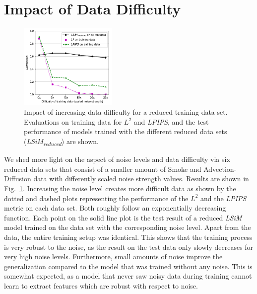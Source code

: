 
\section{Impact of Data Difficulty} \label{append: noise}
\begin{figure}[ht]
    \centering
    \includegraphics[width=0.42\textwidth]{Images/DataDifficulty}
    \vspace{-0.4cm}
    \caption{Impact of increasing data difficulty for a reduced training data set. 
    Evaluations on training data for $L^2$ and \textit{LPIPS}, and the test performance of models trained with the different reduced data sets (\textit{LSiM\textsubscript{reduced}}) are shown.}
    \label{fig: data difficulty}
\end{figure}
We shed more light on the aspect of noise levels and data difficulty via six reduced data sets that consist of a smaller amount of Smoke and Advection-Diffusion data with differently scaled noise strength values. Results are shown in Fig.~\ref{fig: data difficulty}.
Increasing the noise level creates more difficult data as shown by the dotted and dashed plots representing the performance of the \textit{$L^2$} and the \textit{LPIPS} metric on each data set. Both roughly follow an exponentially decreasing function. Each point on the solid line plot is the test result of a reduced \textit{LSiM} model trained on the data set with the corresponding noise level. Apart from the data, the entire training setup was identical. This shows that the training process is very robust to the noise, as the result on the test data only slowly decreases for very high noise levels. Furthermore, small amounts of noise improve the generalization compared to the model that was trained without any noise. This is somewhat expected, as a model that never saw noisy data during training cannot learn to extract features which are robust with respect to noise.



